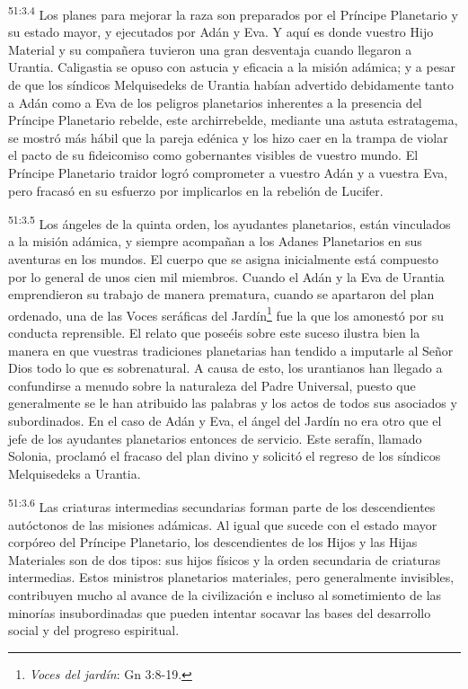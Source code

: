 \par
\textsuperscript{51:3.4} Los planes para mejorar la raza son preparados por el Príncipe Planetario y su estado mayor, y ejecutados por Adán y Eva. Y aquí es donde vuestro Hijo Material y su compañera tuvieron una gran desventaja cuando llegaron a Urantia. Caligastia se opuso con astucia y eficacia a la misión adámica; y a pesar de que los síndicos Melquisedeks de Urantia habían advertido debidamente tanto a Adán como a Eva de los peligros planetarios inherentes a la presencia del Príncipe Planetario rebelde, este archirrebelde, mediante una astuta estratagema, se mostró más hábil que la pareja edénica y los hizo caer en la trampa de violar el pacto de su fideicomiso como gobernantes visibles de vuestro mundo. El Príncipe Planetario traidor logró comprometer a vuestro Adán y a vuestra Eva, pero fracasó en su esfuerzo por implicarlos en la rebelión de Lucifer.

\par
\textsuperscript{51:3.5} Los ángeles de la quinta orden, los ayudantes planetarios, están vinculados a la misión adámica, y siempre acompañan a los Adanes Planetarios en sus aventuras en los mundos. El cuerpo que se asigna inicialmente está compuesto por lo general de unos cien mil miembros. Cuando el Adán y la Eva de Urantia emprendieron su trabajo de manera prematura, cuando se apartaron del plan ordenado, una de las Voces seráficas del Jardín\footnote{\textit{Voces del jardín}: Gn 3:8-19.} fue la que los amonestó por su conducta reprensible. El relato que poseéis sobre este suceso ilustra bien la manera en que vuestras tradiciones planetarias han tendido a imputarle al Señor Dios todo lo que es sobrenatural. A causa de esto, los urantianos han llegado a confundirse a menudo sobre la naturaleza del Padre Universal, puesto que generalmente se le han atribuido las palabras y los actos de todos sus asociados y subordinados. En el caso de Adán y Eva, el ángel del Jardín no era otro que el jefe de los ayudantes planetarios entonces de servicio. Este serafín, llamado Solonia, proclamó el fracaso del plan divino y solicitó el regreso de los síndicos Melquisedeks a Urantia.

\par
\textsuperscript{51:3.6} Las criaturas intermedias secundarias forman parte de los descendientes autóctonos de las misiones adámicas. Al igual que sucede con el estado mayor corpóreo del Príncipe Planetario, los descendientes de los Hijos y las Hijas Materiales son de dos tipos: sus hijos físicos y la orden secundaria de criaturas intermedias. Estos ministros planetarios materiales, pero generalmente invisibles, contribuyen mucho al avance de la civilización e incluso al sometimiento de las minorías insubordinadas que pueden intentar socavar las bases del desarrollo social y del progreso espiritual.

